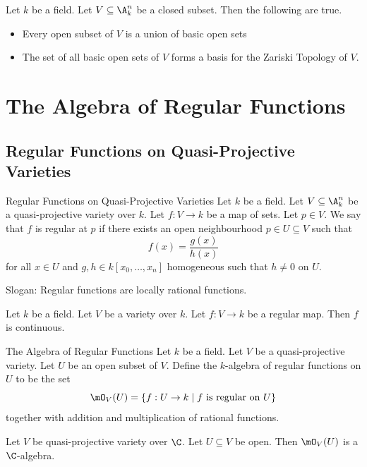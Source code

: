 \documentclass[a4paper]{article}
\begin{document}
\begin{prp}{}{} Let $k$ be a field. Let $V\subseteq\A_k^n$ be a closed subset. Then the following are true. 
\begin{itemize}
\item Every open subset of $V$ is a union of basic open sets
\item The set of all basic open sets of $V$ forms a basis for the Zariski Topology of $V$. 
\end{itemize}
\end{prp}

\pagebreak
\section{The Algebra of Regular Functions}
\subsection{Regular Functions on Quasi-Projective Varieties}
\begin{defn}{Regular Functions on Quasi-Projective Varieties}{} Let $k$ be a field. Let $V\subseteq\A_k^n$ be a quasi-projective variety over $k$. Let $f:V\to k$ be a map of sets. Let $p\in V$. We say that $f$ is regular at $p$ if there exists an open neighbourhood $p\in U\subseteq V$ such that $$f(x)=\frac{g(x)}{h(x)}$$ for all $x\in U$ and $g,h\in k[x_0,\dots,x_n]$ homogeneous such that $h\neq 0$ on $U$. 
\end{defn}

Slogan: Regular functions are locally rational functions. 

\begin{prp}{}{} Let $k$ be a field. Let $V$ be a variety over $k$. Let $f:V\to k$ be a regular map. Then $f$ is continuous. 
\end{prp}

\begin{defn}{The Algebra of Regular Functions}{} Let $k$ be a field. Let $V$ be a quasi-projective variety. Let $U$ be an open subset of $V$. Define the $k$-algebra of regular functions on $U$ to be the set $$\mO_V(U)=\{f:U\to k\;|\;f\text{ is regular on }U\}$$ together with addition and multiplication of rational functions. 
\end{defn}

\begin{lmm}{}{} Let $V$ be quasi-projective variety over $\C$. Let $U\subseteq V$ be open. Then $\mO_V(U)$ is a $\C$-algebra. 
\end{lmm}
\end{document}
